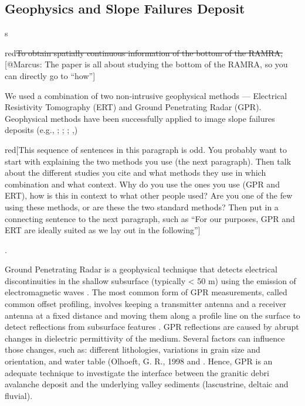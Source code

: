 \documentclass[5p]{elsarticle}
\newcommand{\alon}{\begin{color}{red}}
\newcommand{\aloff}{\end{color}}
\begin{document}


\bigskip

                 
                 
\subsection{Geophysics and Slope Failures Deposit}s

\alon\sout{To obtain spatially continuous information of the bottom of
  the RAMRA,} [@Marcus: The paper is all about studying the bottom of
  the RAMRA, so you can directly go to ``how''] \aloff We used a
combination of two non-intrusive geophysical methods --- Electrical
Resistivity Tomography (ERT) and Ground Penetrating Radar
(GPR). Geophysical methods have been successfully applied to image
slope failures deposits (e.g., \cite{sass2006determination};
\cite{otto2006comparing}; \cite{socco2010geophysical};
\cite{brody2015near},\cite{liu2018near}) \alon [This sequence of
  sentences in this paragraph is odd. You probably want to start with
  explaining the two methods you use (the next paragraph). Then talk about
  the different studies you cite and what methods they use in which
  combination and what context. Why do you use the ones you use (GPR and ERT), how is this in
  context to what other people used? Are you one of the few using
  these methods, or are these the two standard methods? Then put in a
  connecting sentence to the next paragraph, such as ``For our
  purposes, GPR and ERT are ideally suited as we lay out in the
  following''] \aloff.
                 
Ground Penetrating Radar is a geophysical technique that detects electrical discontinuities in the shallow subsurface (typically < 50 m) using the emission of electromagnetic waves \citep{neal2004ground}. The most common form of GPR measurements, called common offset profiling, involves keeping a transmitter antenna and a receiver antenna at a fixed distance and moving them along a profile line on the surface to detect reflections from subsurface features \citep{jol2008ground}. GPR reflections are caused by abrupt changes in dielectric permittivity of the medium. Several factors can influence those changes, such as: different lithologies, variations in grain size and orientation, and water table (Olhoeft, G. R., 1998 and \citep{neal2004ground}. Hence, GPR is an adequate technique to investigate the interface between the  granitic debri avalanche deposit and the underlying  valley sediments (lascustrine, deltaic and fluvial).   
\end{document}
